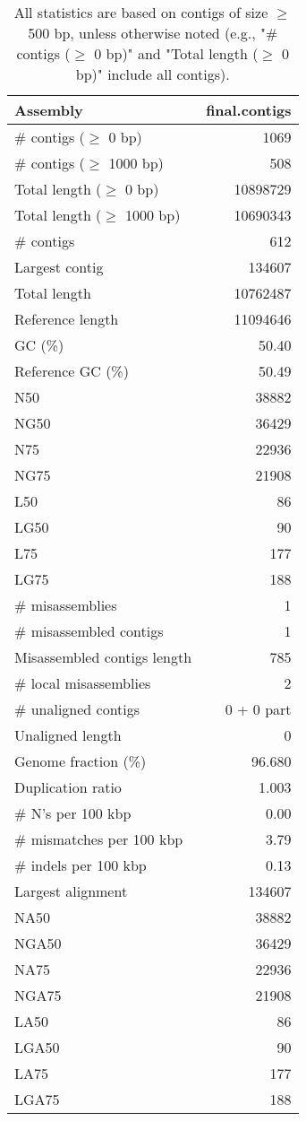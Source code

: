 \documentclass[12pt,a4paper]{article}
\begin{document}
\begin{table}[ht]
\begin{center}
\caption{All statistics are based on contigs of size $\geq$ 500 bp, unless otherwise noted (e.g., "\# contigs ($\geq$ 0 bp)" and "Total length ($\geq$ 0 bp)" include all contigs).}
\begin{tabular}{|l*{1}{|r}|}
\hline
Assembly & final.contigs \\ \hline
\# contigs ($\geq$ 0 bp) & 1069 \\ \hline
\# contigs ($\geq$ 1000 bp) & 508 \\ \hline
Total length ($\geq$ 0 bp) & 10898729 \\ \hline
Total length ($\geq$ 1000 bp) & 10690343 \\ \hline
\# contigs & 612 \\ \hline
Largest contig & 134607 \\ \hline
Total length & 10762487 \\ \hline
Reference length & 11094646 \\ \hline
GC (\%) & 50.40 \\ \hline
Reference GC (\%) & 50.49 \\ \hline
N50 & 38882 \\ \hline
NG50 & 36429 \\ \hline
N75 & 22936 \\ \hline
NG75 & 21908 \\ \hline
L50 & 86 \\ \hline
LG50 & 90 \\ \hline
L75 & 177 \\ \hline
LG75 & 188 \\ \hline
\# misassemblies & 1 \\ \hline
\# misassembled contigs & 1 \\ \hline
Misassembled contigs length & 785 \\ \hline
\# local misassemblies & 2 \\ \hline
\# unaligned contigs & 0 + 0 part \\ \hline
Unaligned length & 0 \\ \hline
Genome fraction (\%) & 96.680 \\ \hline
Duplication ratio & 1.003 \\ \hline
\# N's per 100 kbp & 0.00 \\ \hline
\# mismatches per 100 kbp & 3.79 \\ \hline
\# indels per 100 kbp & 0.13 \\ \hline
Largest alignment & 134607 \\ \hline
NA50 & 38882 \\ \hline
NGA50 & 36429 \\ \hline
NA75 & 22936 \\ \hline
NGA75 & 21908 \\ \hline
LA50 & 86 \\ \hline
LGA50 & 90 \\ \hline
LA75 & 177 \\ \hline
LGA75 & 188 \\ \hline
\end{tabular}
\end{center}
\end{table}
\end{document}
